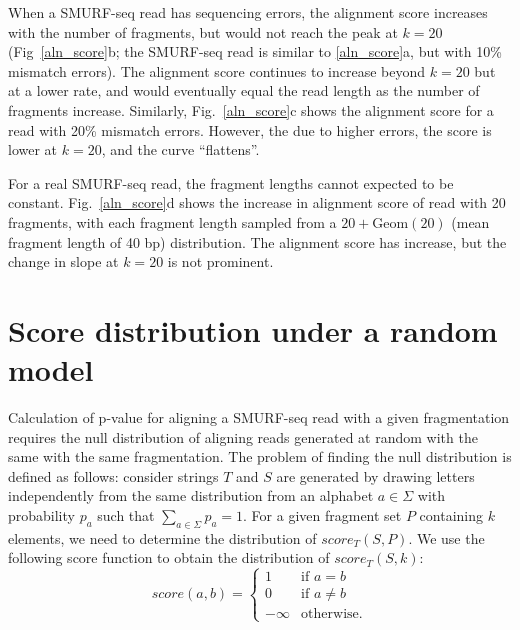 When a SMURF-seq read has sequencing errors, the alignment score
increases with the number of fragments, but would not reach the peak at
$k=20$ (Fig~\ref{aln_score}b; the SMURF-seq read is similar to
\ref{aln_score}a, but with 10\% mismatch errors). The alignment score
continues to increase beyond $k=20$ but at a lower rate, and would
eventually equal the read length as the number of fragments increase.
Similarly, Fig.~\ref{aln_score}c shows the alignment score for a read
with 20\% mismatch errors. However, the due to higher errors, the score
is lower at $k=20$, and the curve ``flattens''.

For a real SMURF-seq read, the fragment lengths cannot expected to be
constant. Fig.~\ref{aln_score}d shows the increase in alignment score of
read with 20 fragments, with each fragment length sampled from a $20 +
\text{Geom}(20)$ (mean fragment length of 40 bp) distribution. The
alignment score has increase, but the change in slope at $k=20$ is not
prominent.

\section{Score distribution under a random model}
Calculation of p-value for aligning a SMURF-seq read with a given
fragmentation requires the null distribution of aligning reads
generated at random with the same with the same fragmentation. The
problem of finding the null distribution is defined as follows:
consider strings $T$ and $S$ are generated by drawing letters independently
from the same distribution from an alphabet $a \in \Sigma$ with
probability $p_a$ such that $\sum_{a \in \Sigma} p_a = 1$.  For a given
fragment set $P$ containing $k$ elements, we need to determine the
distribution of $score_T(S, P)$.
We use the following score function to obtain the distribution of
$score_T(S,k)$:
\begin{equation*}
\label{exact_score}
score(a,b)=\begin{cases} 1 & \text{if } a = b \\
            0 & \text{if } a\neq b \\
            -\infty & \text{otherwise.}
\end{cases}
\end{equation*}

